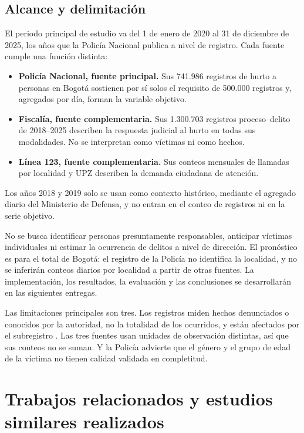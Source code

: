 \documentclass[12pt,letterpaper]{article}
\begin{document}
\subsection{Alcance y delimitación}

El periodo principal de estudio va del 1 de enero de 2020 al 31 de diciembre de 2025, los años que la Policía Nacional publica a nivel de registro. Cada fuente cumple una función distinta:
\begin{itemize}
  \item \textbf{Policía Nacional, fuente principal.} Sus 741.986 registros de hurto a personas en Bogotá sostienen por sí solos el requisito de 500.000 registros y, agregados por día, forman la variable objetivo.
  \item \textbf{Fiscalía, fuente complementaria.} Sus 1.300.703 registros proceso--delito de 2018--2025 describen la respuesta judicial al hurto en todas sus modalidades. No se interpretan como víctimas ni como hechos.
  \item \textbf{Línea 123, fuente complementaria.} Sus conteos mensuales de llamadas por localidad y UPZ describen la demanda ciudadana de atención.
\end{itemize}
Los años 2018 y 2019 solo se usan como contexto histórico, mediante el agregado diario del Ministerio de Defensa, y no entran en el conteo de registros ni en la serie objetivo.

No se busca identificar personas presuntamente responsables, anticipar víctimas individuales ni estimar la ocurrencia de delitos a nivel de dirección. El pronóstico es para el total de Bogotá: el registro de la Policía no identifica la localidad, y no se inferirán conteos diarios por localidad a partir de otras fuentes. La implementación, los resultados, la evaluación y las conclusiones se desarrollarán en las siguientes entregas.

Las limitaciones principales son tres. Los registros miden hechos denunciados o conocidos por la autoridad, no la totalidad de los ocurridos, y están afectados por el subregistro \citep{riascos2023}. Las tres fuentes usan unidades de observación distintas, así que sus conteos no se suman. Y la Policía advierte que el género y el grupo de edad de la víctima no tienen calidad validada en completitud.

\section{Trabajos relacionados y estudios similares realizados}
\end{document}
